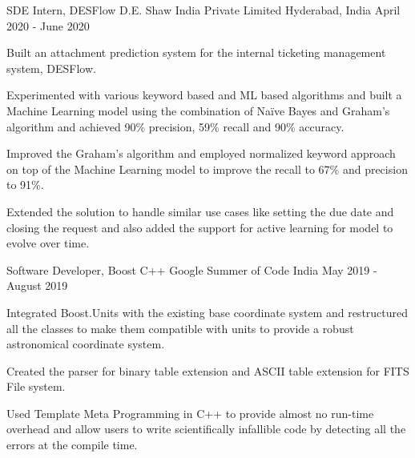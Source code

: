 \begin{cventries}
    
    \cventry
    {SDE Intern, DESFlow}
    {D.E. Shaw India Private Limited}
    {Hyderabad, India}
    {April 2020 - June 2020}
    {
      \begin{cvitems}
        \item {Built an attachment prediction system for the internal ticketing management system, DESFlow.}
        \item {Experimented with various keyword based and ML based algorithms and built a Machine Learning model using the combination of Na\"{i}ve Bayes and Graham's algorithm and achieved 90\% precision, 59\% recall and 90\% accuracy.}
        \item{Improved the Graham's algorithm and employed normalized keyword approach on top of the Machine Learning model to improve the recall to 67\% and precision to 91\%.}
        \item{Extended the solution to handle similar use cases like setting the due date and closing the request and also added the support for active learning for model to evolve over time.}
      \end{cvitems}
    }
        
    \cventry
    {Software Developer, Boost C++}
    {Google Summer of Code}
    {India}
    {May 2019 - August 2019}
    {
      \begin{cvitems}
        \item {Integrated Boost.Units with the existing base coordinate system and restructured all the classes to make them compatible with units to provide a robust astronomical coordinate system.}
        \item {Created the parser for binary table extension and ASCII table extension for FITS File system.}
        \item{Used Template Meta Programming in C++ to provide almost no run-time overhead and allow users to write scientifically infallible code by detecting all the errors at the compile time.}
      \end{cvitems}
    }


\end{cventries}
